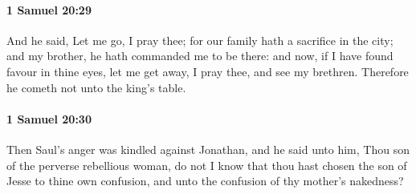 		\paragraph{1 Samuel 20:29} %
			\label{1SAMUEL-20-29}

			And he said, Let me go, I pray thee; for our family hath a sacrifice in the city; and my brother, he hath commanded me to be there: and now, if I have found favour in thine eyes, let me get away, I pray thee, and see my brethren. Therefore he cometh not unto the king’s table.


		\paragraph{1 Samuel 20:30} %
			\label{1SAMUEL-20-30}

			Then Saul’s anger was kindled against Jonathan, and he said unto him, Thou son of the perverse rebellious woman, do not I know that thou hast chosen the son of Jesse to thine own confusion, and unto the confusion of thy mother’s nakedness?

